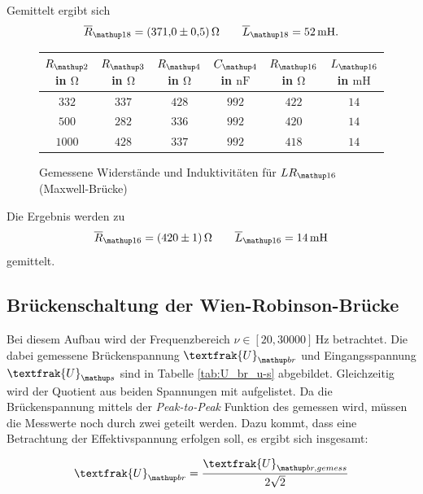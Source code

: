 Gemittelt ergibt sich
\begin{equation}
\label{eq:wert_lr_16_max}
\overline{R}_{\map{18}}=\SI{371\pm0.5}{\ohm} \qquad \overline{L}_{\map{18}}=\SI{52}{\milli\henry}.
\end{equation}


\begin{figure}
\centering
\caption{Gemessene Widerstände und Induktivitäten für $LR\ua{16}$ (Maxwell-Brücke)}
  \label{tab:lc_r16_max}
\begin{tabular}{S S S S S S }
    \toprule
    {$R\ua{2}$  in $\si{\ohm}$} &  {$R\ua{3}$ in $\si{\ohm}$} & {$R\ua{4}$ in $\si{\ohm}$} & {$C\ua{4}$ in $\si{\nano\farad}$}& {$R\ua{16}$ in $\si{\ohm}$} &  {$L\ua{16}$ in $\si{\milli\henry}$} \\
    \midrule
     {$\num{332}$} & {$\num{337}$} &  {$\num{428}$}& {$\num{992}$}  &  {$\num{422}$} & {$\num{14}$}\\
     {$\num{500}$} & {$\num{282}$}  & {$\num{336}$} & {$\num{992}$} & {$\num{420}$} & {$\num{14}$}\\
     {$\num{1000}$} & {$\num{428}$}  & {$\num{337}$} & {$\num{992}$} &{$\num{418}$} & {$\num{14}$}  \\
    \bottomrule
  \end{tabular}
 \end{figure}


Die Ergebnis werden zu 
\begin{equation}
\label{eq:wert_lr_16_max}
\overline{R}_{\map{16}}=\SI{420\pm1}{\ohm} \qquad \overline{L}_{\map{16}}=\SI{14}{\milli\henry}
\end{equation}
gemittelt.

\subsection{Brückenschaltung der Wien-Robinson-Brücke}

Bei diesem Aufbau wird der Frequenzbereich $\nu\in\left[20,30000\right]\,\si{\hertz}$ betrachtet.
Die dabei gemessene Brückenspannung $\textfrak{U}\ua{br}$ und Eingangsspannung $\textfrak{U}\ua{s}$ sind in Tabelle \ref{tab:U_br_u-s} abgebildet.
Gleichzeitig wird der Quotient aus beiden Spannungen mit aufgelistet.
Da die Brückenspannung mittels der \emph{Peak-to-Peak} Funktion des gemessen wird, 
müssen die Messwerte noch durch zwei geteilt werden. Dazu kommt, dass eine Betrachtung der Effektivspannung erfolgen soll, es ergibt sich insgesamt:


\begin{equation*}
\textfrak{U}\ua{br}=\frac{\textfrak{U}\ua{br,gemess}}{2\sqrt{2}}
\end{equation*}



